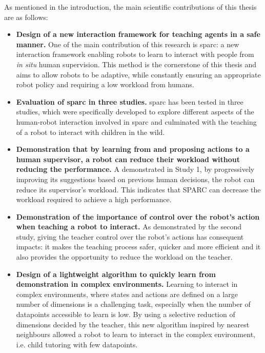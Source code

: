 As mentioned in the introduction, the main scientific contributions of this thesis are as follows:
\begin{itemize}
	\item \textbf{Design of a new interaction framework for teaching agents in a safe manner.} One of the main contribution of this research is \gls{sparc}: a new interaction framework enabling robots to learn to interact with people from \textit{in situ} human supervision. This method is the cornerstone of this thesis and aims to allow robots to be adaptive, while constantly ensuring an appropriate robot policy and requiring a low workload from humans.
	
	\item \textbf{Evaluation of \gls{sparc} in three studies.} \gls{sparc} has been tested in three studies, which were specifically developed to explore different aspects of the human-robot interaction involved in \gls{sparc} and culminated with the teaching of a robot to interact with children in the wild.
	
	\item \textbf{Demonstration that by learning from and proposing actions to a human supervisor, a robot can reduce their workload without reducing the performance.} A demonstrated in Study 1, by progressively improving its suggestions based on previous human decisions, the robot can reduce its supervisor's workload. This indicates that SPARC can decrease the workload required to achieve a high performance.
	
	\item \textbf{Demonstration of the importance of control over the robot's action when teaching a robot to interact.} As demonstrated by the second study, giving the teacher control over the robot's actions has consequent impacts: it makes the teaching process safer, quicker and more efficient and it also provides the opportunity to reduce the workload on the teacher.
	
	\item \textbf{Design of a lightweight algorithm to quickly learn from demonstration in complex environments.} Learning to interact in complex environments, where states and actions are defined on a large number of dimensions is a challenging task, especially when the number of datapoints accessible to learn is low. By using a selective reduction of dimensions decided by the teacher, this new algorithm inspired by nearest neighbours allowed a robot to learn to interact in the complex environment, i.e. child tutoring with few datapoints. 
	

\end{itemize}

